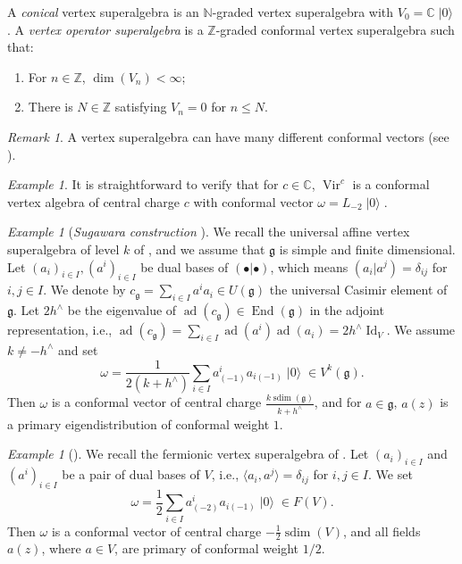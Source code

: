 \documentclass[a4paper, 12pt, reqno]{amsart}
\theoremstyle{remark}
\newtheorem{remark}[theorem]{Remark}
\newtheorem{example}[theorem]{Example}
\DeclareMathOperator{\Vir}{Vir}
\DeclareMathOperator{\Id}{Id}
\DeclareMathOperator{\End}{End}
\DeclareMathOperator{\vac}{|0\rangle}
\DeclareMathOperator{\ad}{ad}
\DeclareMathOperator{\sdim}{sdim}
\begin{document}
A \emph{conical} vertex superalgebra is an $\mathbb{N}$-graded vertex superalgebra with $V_0 = \mathbb{C}\vac$.
A \emph{vertex operator superalgebra} is a $\mathbb{Z}$-graded conformal vertex superalgebra such that:
\begin{enumerate}
\item For $n \in \mathbb{Z}$, $\dim(V_n) < \infty$;
\item There is $N \in \mathbb{Z}$ satisfying $V_n = 0$ for $n \le N$.
\end{enumerate}

\begin{remark}
  \label{rmk:19}
  A vertex superalgebra can have many different conformal vectors (see \cite[Example 2.5.9]{frenkel_vertex_2001}).
\end{remark}

\begin{example}
  \label{exa:8}
  It is straightforward to verify that for $c \in \mathbb{C}$, $\Vir^c$ is a conformal vertex algebra of central charge $c$ with conformal vector $\omega = L_{-2}\vac$.
\end{example}

\begin{example}[\emph{Sugawara construction} {\cite[Theorem 5.7]{kac_vertex_1998}}]
  \label{exa:9}
  We recall the universal affine vertex superalgebra of level $k$ of , and we assume that $\mathfrak{g}$ is simple and finite dimensional.
  Let $(a_i)_{i \in I}, (a^i)_{i \in I}$ be dual bases of $(\bullet| \bullet)$, which means $(a_i| a^j) = \delta_{ij}$ for $i, j \in I$.
  We denote by $c_{\mathfrak{g}} = \sum_{i \in I}a^ia_i \in U(\mathfrak{g})$ the universal Casimir element of $\mathfrak{g}$.
  Let $2h^{\wedge}$ be the eigenvalue of $\ad(c_{\mathfrak{g}}) \in \End(\mathfrak{g})$ in the adjoint representation, i.e., $\ad(c_{\mathfrak{g}}) = \sum_{i \in I}\ad(a^i)\ad(a_i) = 2h^{\wedge}\Id_V$.
  We assume $k \neq -h^{\wedge}$ and set
  \begin{equation*}
    \omega = \frac{1}{2(k + h^{\wedge})}\sum_{i \in I}a^i_{(-1)}a_{i(-1)}\vac \in V^k(\mathfrak{g}).
  \end{equation*}
  Then $\omega$ is a conformal vector of central charge $\frac{k\sdim(\mathfrak{g})}{k + h^{\wedge}}$, and for $a \in \mathfrak{g}$, $a(z)$ is a primary eigendistribution of conformal weight $1$.
\end{example}

\begin{example}[{\cite[Proposition 4.10]{kac_vertex_1998}}]
  \label{exa:10}
  We recall the fermionic vertex superalgebra of .
  Let $(a_i)_{i \in I}$ and $(a^i)_{i \in I}$ be a pair of dual bases of $V$, i.e., $\langle a_i, a^j\rangle = \delta_{ij}$ for $i, j \in I$.
  We set
  \begin{equation*}
    \omega = \frac{1}{2}\sum_{i \in I}a^i_{(-2)}a_{i(-1)}\vac \in F(V).
  \end{equation*}
  Then $\omega$ is a conformal vector of central charge $-\frac{1}{2}\sdim(V)$, and all fields $a(z)$, where $a \in V$, are primary of conformal weight $1/2$.
\end{example}
\end{document}
